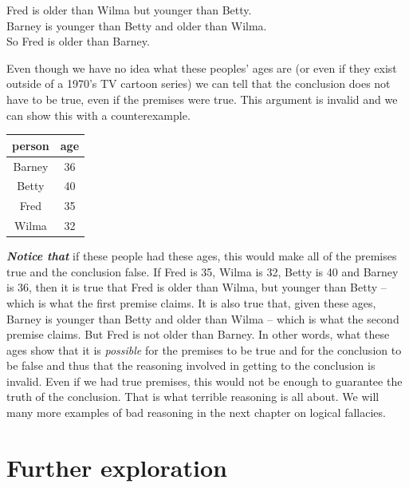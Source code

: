 \documentclass[12pt, openany]{book}
\begin{document}
\begin{center}

\begin{argument}

Fred is older than Wilma but younger than Betty.\\
Barney is younger than Betty and older than Wilma.\\

So Fred is older than Barney.

\end{argument}

\end{center}

Even though we have no idea what these peoples' ages are (or even if they exist outside of a 1970's TV cartoon series) we can tell that the conclusion does not have to be true, even if the premises were true. This argument is invalid and we can show this with a counterexample.

\begin{longtable}[]{@{}cc@{}}
\toprule
person & age\tabularnewline
\midrule
\endhead
Barney & 36\tabularnewline
Betty & 40\tabularnewline
Fred & 35\tabularnewline
Wilma & 32\tabularnewline
\bottomrule
\end{longtable}

\textbf{\emph{Notice that}} if these people had these ages, this would make all of the premises true and the conclusion false. If Fred is 35, Wilma is 32, Betty is 40 and Barney is 36, then it is true that Fred is older than Wilma, but younger than Betty -- which is what the first premise claims. It is also true that, given these ages, Barney is younger than Betty and older than Wilma -- which is what the second premise claims. But Fred is not older than Barney. In other words, what these ages show that it is \emph{possible} for the premises to be true and for the conclusion to be false and thus that the reasoning involved in getting to the conclusion is invalid. Even if we had true premises, this would not be enough to guarantee the truth of the conclusion. That is what terrible reasoning is all about. We will many more examples of bad reasoning in the next chapter on logical fallacies.

\hypertarget{further-exploration-1}{%
\section*{Further exploration}\label{further-exploration-1}}
\end{document}

